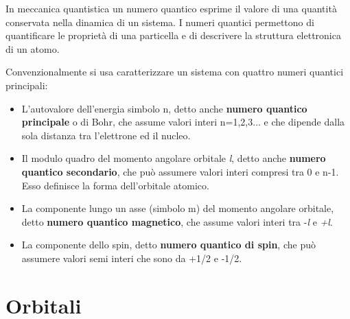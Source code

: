 \documentclass[10pt,a4paper]{article}
\begin{document}
In meccanica quantistica un numero quantico esprime il valore di una quantità conservata nella dinamica di un sistema. I numeri quantici permettono di quantificare le proprietà di una particella e di descrivere la struttura elettronica di un atomo.

Convenzionalmente si usa caratterizzare un sistema con quattro numeri quantici principali:

\begin{itemize}


\item L'autovalore dell'energia simbolo n, detto anche \textbf{numero quantico principale} o di Bohr, che assume valori interi n=1,2,3... e che dipende dalla sola distanza tra l'elettrone ed il nucleo.

\item Il modulo quadro del momento angolare orbitale \textit{l}, detto anche \textbf{numero quantico secondario}, che può assumere valori interi compresi tra 0 e n-1. Esso definisce la forma dell'orbitale atomico.

\item La componente lungo un asse (simbolo m) del momento angolare orbitale, detto \textbf{numero quantico magnetico}, che assume valori interi tra -\textit{l} e \textit{+l}.

\item La componente dello spin, detto \textbf{numero quantico di spin}, che può assumere valori semi interi che sono da +1/2 e -1/2.	
\end{itemize}

\section{Orbitali}
	
\end{document}
